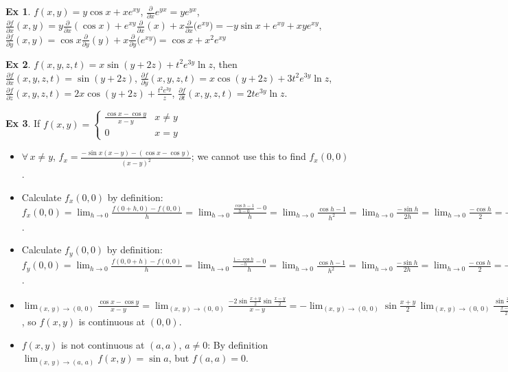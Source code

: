 \documentclass[12pt]{extarticle}
\newcommand{\ds}{\displaystyle}
\theoremstyle{definition}
\newtheorem*{ex}{Ex}
\newcommand{\pdiff}[2]{\frac{\partial #1}{\partial #2}}
\begin{document}
\begin{ex}
  $\ds f(x,y) = y\cos x + xe^{xy}$, $\ds\pdiff{}{x} e^{yx}=y e^{yx}$, $\ds\pdiff{f}{x}(x,y) = y\pdiff{}{x}(\cos x) + e^{xy}\pdiff{}{x}(x) + x\pdiff{}{x}\big(e^{xy}\big) = -y\sin x + e^{xy} + x y e^{xy}$, $\ds\pdiff{f}{y}(x,y) = \cos x\pdiff{}{y}(y) + x\pdiff{}{y}\big(e^{xy}\big) = \cos x + x^2e^{xy}$
\end{ex}

\begin{ex}
  $\ds f(x, y, z, t) = x\sin(y + 2z) + t^2 e^{3y}\ln z$, then $\ds\pdiff{f}{x}(x,y,z,t) = \sin(y+2z)$, $\ds\pdiff{f}{y}(x,y,z,t) = x\cos(y+2z) +3t^2e^{3y}\ln z$, $\ds\pdiff{f}{z}(x,y,z,t) = 2x \cos(y + 2z) +\frac{t^2e^{3y}}{z}$, $\ds\pdiff{f}{t}(x,y,z,t) = 2t e^{3y}\ln z$. 
\end{ex}

\begin{ex} If $\ds f(x,y) = \begin{cases}\frac{\cos x - \cos y}{x - y} & x\ne y\\ 0 & x=y\end{cases}$
  \begin{itemize}\setlength{\itemsep}{0pt}
    \item $\forall\,x\ne y$, $\ds f_x = \frac{-\sin x(x - y) - (\cos x - \cos y)}{(x - y)^2}$; we cannot use this to find $f_x(0, 0)$. 
    \item Calculate $\ds f_x(0, 0)$ by definition: $\ds f_x(0, 0) = \lim_{h\to 0}\frac{f(0 + h, 0) - f(0, 0)}{h} = \lim_{h\to 0}\frac{\frac{\cos h - 1}{h - 0} - 0}{h} = \lim_{h\to 0}\frac{\cos h-1}{h^2} = \lim_{h\to 0}\frac{-\sin h}{2h} = \lim_{h\to 0}\frac{-\cos h}{2} = -\frac{1}{2}$. 
    \item Calculate $\ds f_y(0, 0)$ by definition: $\ds f_y(0, 0) = \lim_{h\to 0}\frac{f(0, 0 + h) - f(0, 0)}{h} = \lim_{h\to 0}\frac{\frac{1 - \cos h}{-h} - 0}{h} = \lim_{h\to 0}\frac{\cos h-1}{h^2} = \lim_{h\to 0}\frac{-\sin h}{2h} = \lim_{h\to 0}\frac{-\cos h}{2} = -\frac{1}{2}$. 
    \item $\ds\lim_{(x,\,y)\to (0,\,0)}\frac{\cos x - \cos y}{x - y} = \lim_{(x,\,y)\to (0,\,0)}\frac{-2\sin\frac{x + y}{2}\sin\frac{x - y}{2}}{x - y} = -\lim_{(x,\,y)\to (0,\,0)}\sin\frac{x + y}{2}\,\lim_{(x,\,y)\to (0,\,0)}\frac{\sin\frac{x - y}{2}}{\frac{x - y}{2}} = 0$, so $f(x, y)$ is continuous at $(0, 0)$. 
    \item $\ds f(x, y)$ is not continuous at $(a, a)$, $a\ne 0$: By definition $\ds\lim_{(x,\,y)\to(a,\,a)}f(x, y) = \sin a$, but $f(a, a) = 0$. 
  \end{itemize}
\end{ex}
\end{document}
